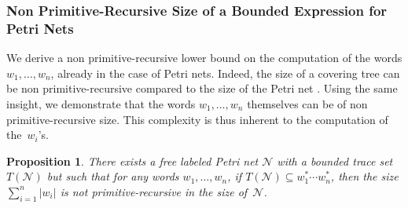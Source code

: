 \documentclass[11pt,reqno,a4paper]{amsart}
\renewcommand{\cite}{\citep}
\theoremstyle{plain}
\newtheorem{proposition}[theorem]{Proposition}
\theoremstyle{definition}
\theoremstyle{remark}
\begin{document}
 
\subsubsection{Non Primitive-Recursive Size of a Bounded Expression for Petri Nets}\label{sub:prim}
We derive a non primitive-recursive lower bound on the computation of
the words $w_1,\dots,w_n$, already in the case of Petri nets.
Indeed, the size of a covering tree can be
non primitive-recursive compared to the size of the Petri net
\cite[who attribute the idea to Hack]{cardoza}.  Using the same insight,
we demonstrate that the words $w_1,\dots,w_n$ themselves can be of
non primitive-recursive size.  This complexity is thus inherent to the
computation of the~$w_i$'s.

\begin{proposition}\label{propnp}
  There exists a free labeled Petri net $\mathcal{N}$ with a bounded
  trace set $T(\mathcal{N})$ but such that for any words
  $w_1,\dots,w_n$, if $T(\mathcal{N})\subseteq w_1^\ast\cdots
  w_n^\ast$, then the size $\sum_{i=1}^n|w_i|$ is not
  primitive-recursive in the size of~$\mathcal{N}$.
\end{proposition}
\end{document}
